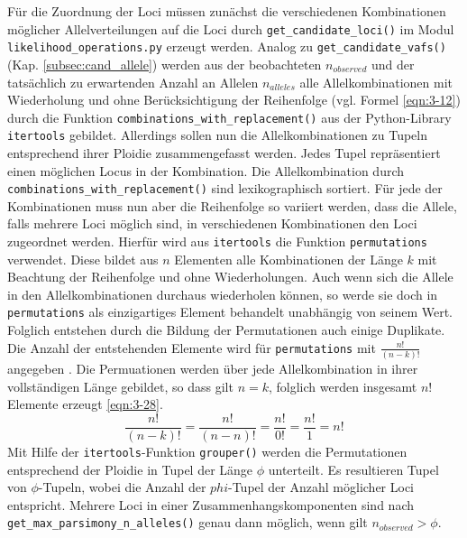 Für die Zuordnung der Loci müssen zunächst die verschiedenen Kombinationen möglicher Allelverteilungen auf die Loci durch \lstinline|get_candidate_loci()| im Modul \linebreak \lstinline|likelihood_operations.py| erzeugt werden. Analog zu \lstinline|get_candidate_vafs()| (Kap. \ref{subsec:cand_allele}) werden aus der beobachteten $n_{observed} $ und der tatsächlich zu erwartenden Anzahl an Allelen $n_{alleles}$ alle Allelkombinationen mit Wiederholung und ohne Berücksichtigung der Reihenfolge  (vgl. Formel \eqref{eqn:3-12}) durch die Funktion \lstinline|combinations_with_replacement()| aus der Python-Library \lstinline|itertools| gebildet. Allerdings sollen nun die Allelkombinationen zu Tupeln entsprechend ihrer Ploidie zusammengefasst werden. Jedes Tupel repräsentiert einen möglichen Locus in der Kombination. Die Allelkombination durch \linebreak \lstinline|combinations_with_replacement()| sind lexikographisch sortiert. Für jede der Kombinationen muss nun aber die Reihenfolge so variiert werden, dass die Allele, falls mehrere Loci möglich sind, in verschiedenen Kombinationen den Loci zugeordnet werden. Hierfür wird aus \lstinline|itertools| die Funktion \lstinline|permutations| verwendet. Diese bildet aus $ n $ Elementen alle Kombinationen der Länge $ k $ mit Beachtung der Reihenfolge und ohne Wiederholungen. Auch wenn sich die Allele in den Allelkombinationen durchaus wiederholen können, so werde sie doch in \lstinline|permutations| als einzigartiges Element behandelt unabhängig von seinem Wert. Folglich entstehen durch die Bildung der Permutationen auch einige Duplikate. Die Anzahl der entstehenden Elemente wird für \lstinline|permutations| mit  $ \frac{n!}{(n-k)!} $ angegeben \cite{itertools}. Die Permuationen werden über jede Allelkombination in ihrer vollständigen Länge gebildet, so dass gilt $ n = k $, folglich werden insgesamt $ n! $ Elemente erzeugt \eqref{eqn:3-28}. 
\begin{equation} \label{eqn:3-28}
\tag{3-28}
\frac{n!}{(n-k)!}=\frac{n!}{(n-n)!}=\frac{n!}{0!}=\frac{n!}{1}=n!
\end{equation}
Mit Hilfe der \lstinline|itertools|-Funktion \lstinline|grouper()| werden die Permutationen entsprechend der Ploidie in Tupel der Länge $\phi$ unterteilt. Es resultieren Tupel von $ \phi $-Tupeln, wobei die Anzahl der $phi$-Tupel der Anzahl möglicher Loci entspricht. Mehrere Loci in einer Zusammenhangskomponenten sind nach \lstinline|get_max_parsimony_n_alleles()| genau dann möglich, wenn gilt $n_{observed} > \phi $.\\

